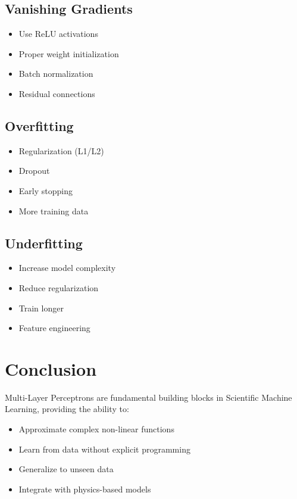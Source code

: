 \documentclass{article}
\begin{document}
\subsection{Vanishing Gradients}
\begin{itemize}
    \item Use ReLU activations
    \item Proper weight initialization
    \item Batch normalization
    \item Residual connections
\end{itemize}

\subsection{Overfitting}
\begin{itemize}
    \item Regularization (L1/L2)
    \item Dropout
    \item Early stopping
    \item More training data
\end{itemize}

\subsection{Underfitting}
\begin{itemize}
    \item Increase model complexity
    \item Reduce regularization
    \item Train longer
    \item Feature engineering
\end{itemize}

\section{Conclusion}

Multi-Layer Perceptrons are fundamental building blocks in Scientific Machine Learning, providing the ability to:

\begin{itemize}
    \item Approximate complex non-linear functions
    \item Learn from data without explicit programming
    \item Generalize to unseen data
    \item Integrate with physics-based models
\end{itemize}
\end{document}

